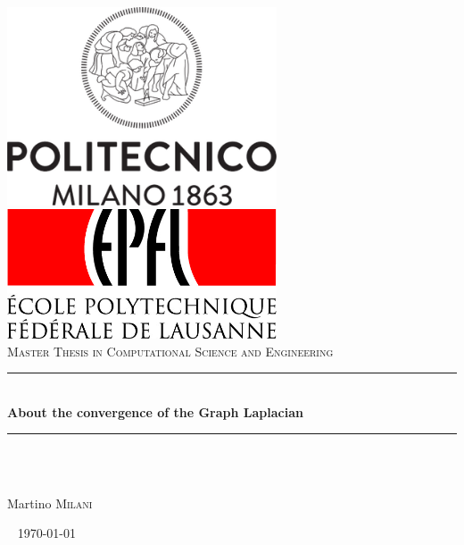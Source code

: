 \documentclass[12pt,titlepage]{article}
\theoremstyle{definition}
\theoremstyle{remark}
\begin{document}

\begin{titlepage}
\newcommand{\HRule}{\rule{\linewidth}{1mm}} %

\center %
\includegraphics[width=8cm]{Figs/Cover/polimi.png}\\[1.5cm]
\includegraphics[width=8cm]{Figs/Cover/EPFL.jpg}\\[1.5cm]
\textsc{\LARGE Master Thesis in Computational Science and Engineering}\\[1.cm]

\HRule \\[0.4cm]
{ \huge \bfseries About the convergence of the Graph Laplacian}\\[0.4cm] 
\HRule \\[1.5cm]     

\begin{minipage}{0.4\textwidth}
\begin{flushleft} \large
\emph{}\\
Martino \textsc{Milani}\\
\end{flushleft}
\end{minipage}
~
{\large \today }\\[2cm] %
\vfill %
\end{titlepage}
\end{document}
